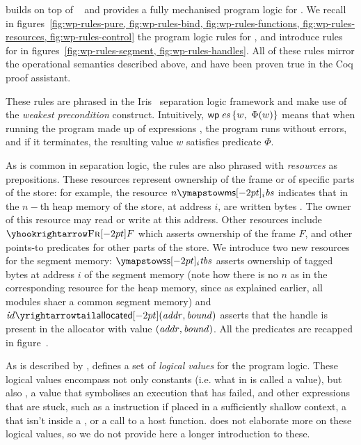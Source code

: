 \documentclass[acmsmall,screen]{acmart}\settopmatter{}
\begin{document}
\irismswasm builds on top of \iriswasm~\cite{iriswasm} and provides a fully mechanised program logic for \mswasm. We recall in figures~\ref{fig:wp-rules-pure, fig:wp-rules-bind, fig:wp-rules-functions, fig:wp-rules-resources, fig:wp-rules-control} the program logic rules for \iriswasm, and introduce rules for \irismswasm in figures~\ref{fig:wp-rules-segment, fig:wp-rules-handles}. All of these rules mirror the operational semantics described above, and have been proven true in the Coq proof assistant.

These rules are phrased in the Iris~\cite{iris} separation logic framework and make use of the \emph{weakest precondition} construct. Intuitively, \( \wpre{\V{es}}{w,~\Phi(w)} \) means that when running the program made up of expressions , the program runs without errors, and if it terminates, the resulting value \( w \) satisfies predicate \( \Phi \).

As is common in separation logic, the rules are also phrased with \emph{resources} as prepositions. These resources represent ownership of the frame or of specific parts of the store: for example, the resource \( n\wmspt{i}{\V{bs}} \) indicates that in the \( n-\)th heap memory of the store, at address \( i \), are written bytes . The owner of this resource may read or write at this address. Other resources include \( \frameR{F} \) which asserts ownership of the frame \( F \), and other points-to predicates for other parts of the store. We introduce two new resources for the segment memory: \( \wsspt{i}{\V{tbs}} \) asserts ownership of tagged bytes  at address \( i \) of the segment memory (note how there is no \( n \) as in the corresponding resource for the heap memory, since as explained earlier, all modules shaer a common segment memory) and \( \V{id}\allpt(\V{addr},\V{bound}) \) asserts that the handle \xxWid {} is present in the allocator with value \( (\mathit{addr},\mathit{bound}) \). All the predicates are recapped in figure~\cite{fig:pointstos}.

As is described by \citet{iriswasm}, \iriswasm defines a set of \emph{logical values} for the program logic. These logical values encompass not only constants (i.e. what in \wasm is called a value), but also \xxWtrap, a value that symbolises an execution that has failed, and other expressions that are stuck, such as a  instruction if placed in a sufficiently shallow context, a \xxWreturn that isn't inside a , or a call to a host function. \irismswasm does not elaborate more on these logical values, so we do not provide here a longer introduction to these.
\end{document}
